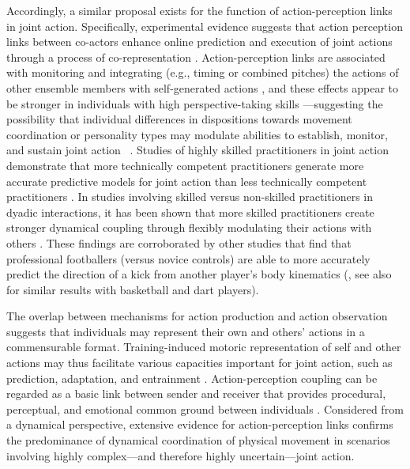 \begin{CJK}{UTF8}{gbsn}
Accordingly, a similar proposal exists for the function of action-perception links in joint action. Specifically, experimental evidence suggests that action perception links between co-actors enhance online prediction and execution of joint actions through a process of co-representation \citep{Novembre2014}.  Action-perception links are associated with monitoring and integrating (e.g., timing or combined pitches) the actions of other ensemble members with self-generated actions \citep{Loehr2013}, and these effects appear to be stronger in individuals with high perspective-taking skills \citep{Novembre2012,Loehr2013}---suggesting the possibility that individual differences in dispositions towards movement coordination or personality types may modulate abilities to establish, monitor, and sustain joint action ~\citep{Marsh2009,Keller2012}.
Studies of highly skilled practitioners in joint action demonstrate that more technically competent practitioners generate more accurate predictive models for joint action than less technically competent practitioners \citep{Tomeo2012,Aglioti2008,Mulligan2016}.  In studies involving skilled versus non-skilled practitioners in dyadic interactions, it has been shown that more skilled practitioners create stronger dynamical coupling through flexibly modulating their actions with others \citep{Schmidt2011,Caron2017}.  These findings are corroborated by other studies that find that professional footballers (versus novice controls) are able to more accurately predict the direction of a kick from another player's body kinematics (\cite{Tomeo2012}, see also \cite{Aglioti2008,Mulligan2016} for similar results with basketball and dart players).

The overlap between mechanisms for action production and action observation suggests that individuals may represent their own and others' actions in a commensurable format. Training-induced motoric representation of self and other actions may thus facilitate various capacities important for joint action, such as prediction, adaptation, and entrainment \citep{Novembre2014}.  Action-perception coupling can be regarded as a basic link between sender and receiver that provides procedural, perceptual, and emotional common ground between individuals \citep{Rizzolatti1998}. Considered from a dynamical perspective, extensive evidence for action-perception links confirms the predominance of dynamical coordination of physical movement in scenarios involving highly complex---and therefore highly uncertain---joint action.


\end{CJK}
